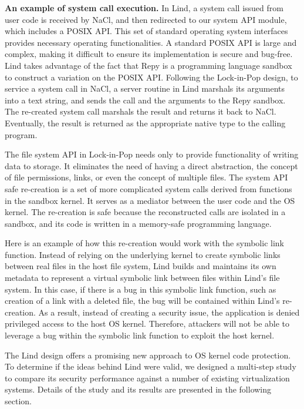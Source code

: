 \textbf{An example of system call execution.}
In Lind, a system call issued from user code is
received by NaCl, and then redirected to our system API module, which
includes a POSIX API. This set of standard
operating system interfaces provides
necessary operating functionalities. A standard POSIX API is large and complex,
making it difficult to ensure its implementation is secure and bug-free.
Lind takes advantage of the fact that Repy is a programming language sandbox to
construct a variation on the POSIX API. Following the
Lock-in-Pop design, to service a system call in NaCl, a server routine in
Lind marshals its arguments into a text string, and sends the call and the arguments
to the Repy sandbox. The re-created system call marshals the result and
returns it back to NaCl. Eventually, the result is returned as the appropriate
native type to the calling program.

The file system API in Lock-in-Pop needs only
to provide functionality of writing data to storage.
It eliminates the need of having a direct abstraction, the
concept of file permissions, links, or even the concept of multiple files.
The system API safe re-creation is a set of more complicated system calls
derived from functions in the sandbox kernel.
It serves as a mediator between the user code
and the OS kernel. The re-creation is safe
because the reconstructed calls are isolated in a sandbox, and its code is written
 in a memory-safe programming language.

Here is an example of how this re-creation would work with the symbolic link function. 
Instead of relying on the underlying kernel to create symbolic links between real files 
in the host file system, Lind builds and maintains its own metadata to represent a virtual symbolic link 
between files within Lind's file system. In this case, if there is a bug in this symbolic link function, 
such as creation of a link with a deleted file, the bug will be contained within Lind's re-creation. 
As a result, instead of creating a security issue, the application is denied privileged access
to the host OS kernel. 
Therefore, attackers will not be able to leverage a bug within the symbolic link function to 
exploit the host kernel.  

The Lind design offers a promising new approach to OS kernel code protection.
 To determine if the ideas behind Lind were valid, we
designed a multi-step study to compare its security performance against a number
 of existing virtualization systems. Details of the study and its results are presented
 in the following section.
